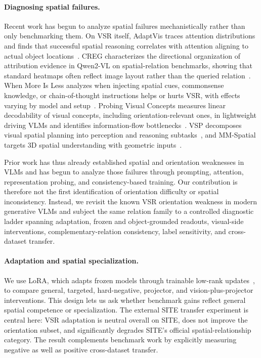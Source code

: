 \paragraph{Diagnosing spatial failures.}
Recent work has begun to analyze spatial failures mechanistically rather than only benchmarking them. On VSR itself, AdaptVis traces attention distributions and finds that successful spatial reasoning correlates with attention aligning to actual object locations~\cite{chen2025adaptvis}. CREG characterizes the directional organization of attribution evidence in Qwen2-VL on spatial-relation benchmarks, showing that standard heatmaps often reflect image layout rather than the queried relation~\cite{tan2026creg}. When More Is Less analyzes when injecting spatial cues, commonsense knowledge, or chain-of-thought instructions helps or hurts VSR, with effects varying by model and setup~\cite{akasaka2026whenmore}. Probing Visual Concepts measures linear decodability of visual concepts, including orientation-relevant ones, in lightweight driving VLMs and identifies information-flow bottlenecks~\cite{theodoridis2026probing}. VSP decomposes visual spatial planning into perception and reasoning subtasks~\cite{wu2025vsp}, and MM-Spatial targets 3D spatial understanding with geometric inputs~\cite{daxberger2025mmspatial}.

Prior work has thus already established spatial and orientation weaknesses in VLMs and has begun to analyze those failures through prompting, attention, representation probing, and consistency-based training. Our contribution is therefore not the first identification of orientation difficulty or spatial inconsistency. Instead, we revisit the known VSR orientation weakness in modern generative VLMs and subject the same relation family to a controlled diagnostic ladder spanning adaptation, frozen and object-grounded readouts, visual-side interventions, complementary-relation consistency, label sensitivity, and cross-dataset transfer.

\paragraph{Adaptation and spatial specialization.}
We use LoRA, which adapts frozen models through trainable low-rank updates~\cite{hu2021lora}, to compare general, targeted, hard-negative, projector, and vision-plus-projector interventions. This design lets us ask whether benchmark gains reflect general spatial competence or specialization. The external SITE transfer experiment is central here: VSR adaptation is neutral overall on SITE, does not improve the orientation subset, and significantly degrades SITE's official spatial-relationship category. The result complements benchmark work by explicitly measuring negative as well as positive cross-dataset transfer.

